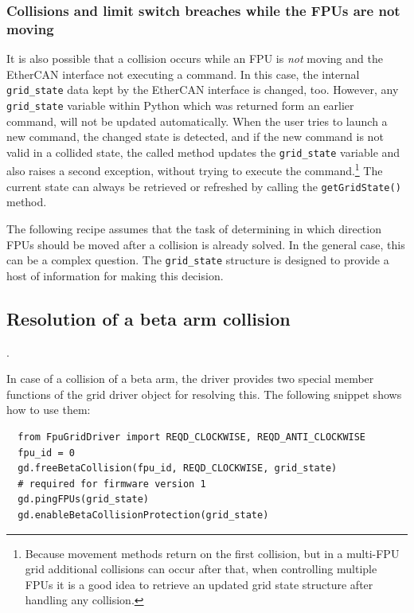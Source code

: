\documentclass[11pt,a4paper]{report}
\begin{document}
\subsubsection{Collisions and limit switch breaches while the FPUs are not moving}
 It is also possible that
a collision occurs while an FPU is \emph{not} moving and the EtherCAN interface
not executing a command.  In this case, the internal
\texttt{grid\_state} data kept by the EtherCAN interface is changed, too. However,
any \texttt{grid\_state} variable within Python which was returned
form an earlier command, will not be updated automatically. When the
user tries to launch a new command, the changed state is detected, and
if the new command is not valid in a collided state, the called method
updates the \texttt{grid\_state} variable and also raises a second
exception, without trying to execute the command.\footnote{Because
  movement methods return on the first collision, but in a multi-FPU
  grid additional collisions can occur after that, when controlling
  multiple FPUs it is a good idea to retrieve an updated grid state
  structure after handling any collision.}  The current state can
always be retrieved or refreshed by calling the
\texttt{getGridState()} method.

The following recipe assumes that the task of determining in which
direction FPUs should be moved after a collision is already solved.
In the general case, this can be a complex question. The
\texttt{grid\_state} structure is designed to provide a host of
information for making this decision.

\subsection{Resolution of a beta arm collision}
\label{sec:betacollisionresolution}.

In case of a collision of a beta arm, the driver provides two special
member functions of the grid driver object for resolving this. The
following snippet shows how to use them:

\begin{verbatim}
  from FpuGridDriver import REQD_CLOCKWISE, REQD_ANTI_CLOCKWISE
  fpu_id = 0
  gd.freeBetaCollision(fpu_id, REQD_CLOCKWISE, grid_state)
  # required for firmware version 1
  gd.pingFPUs(grid_state)
  gd.enableBetaCollisionProtection(grid_state)
\end{verbatim}
\end{document}
